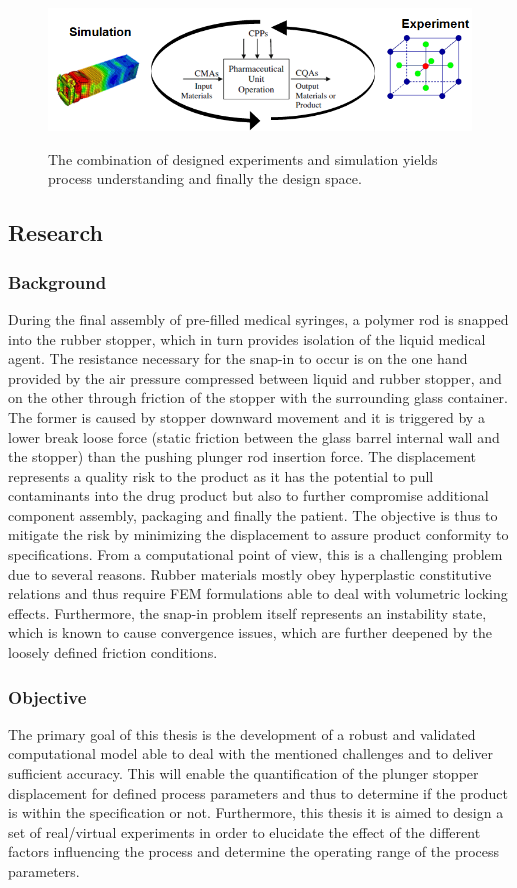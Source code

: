 \begin{figure}[h!]	
	\centering
\includegraphics[height=4cm]{img/DesignSpace.PNG}
   \caption{The combination of designed experiments and simulation yields process understanding and finally the design space.}
 \label{fgr:PFS}
\end{figure}
\newpage
\subsection{Research}

\subsubsection{Background}
During the final assembly of pre-filled medical syringes, a polymer rod is snapped into the
rubber stopper, which in turn provides isolation of the liquid medical agent. The resistance
necessary for the snap-in to occur is on the one hand provided by the air pressure compressed between liquid and rubber stopper, and on the other through friction of the stopper with the surrounding glass container. The former is caused by stopper downward movement and it is triggered by a lower break loose force (static friction between the glass barrel internal wall and the stopper) than the pushing plunger rod insertion force. The displacement represents a quality risk to the product as it has the potential to pull contaminants into the drug product but also to further compromise additional component assembly, packaging and finally the patient. The objective is thus to mitigate the risk by minimizing the displacement to assure product conformity to specifications. 
From a computational point of view, this is a challenging problem due to several reasons. Rubber materials mostly obey hyperplastic constitutive relations and thus require FEM formulations able to deal with volumetric locking effects. Furthermore, the snap-in problem itself represents an instability state, which is known to cause convergence issues, which are further deepened by the loosely defined friction conditions.

\subsubsection{Objective}
The primary goal of this thesis is the development of a robust and validated computational
model able to deal with the mentioned challenges and to deliver sufficient accuracy. This will enable the quantification of the plunger stopper displacement for defined process parameters and thus to determine if the product is within the specification or not.
Furthermore, this thesis it is aimed to design a set of real/virtual experiments in order to elucidate the effect of the different factors influencing the process and determine the operating range of the process parameters.

